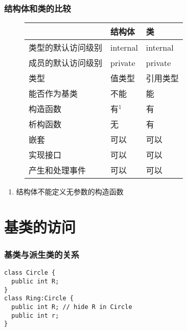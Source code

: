 \begin{frame}
\frametitle{结构体和类的比较}
\begin{figure}
  \centering
  \begin{tabular}{l|l|l}
    \hline
                       & 结构体   & 类       \\
    \hline
    类型的默认访问级别 & internal & internal \\
    成员的默认访问级别 & private  & private  \\
    类型               & 值类型   & 引用类型 \\
    能否作为基类       & 不能     & 能       \\
    构造函数           & 有$^{1}$ & 有       \\
    析构函数           & 无       & 有       \\
    嵌套               & 可以     & 可以     \\
    实现接口           & 可以     & 可以     \\
    产生和处理事件     & 可以     & 可以     \\
    \hline
  \end{tabular}
\end{figure}
\begin{enumerate}
\item 结构体不能定义无参数的构造函数
\end{enumerate}

\end{frame}

\section{基类的访问}

\begin{frame}[fragile]
\frametitle{基类与派生类的关系}
\begin{lstlisting}[escapeinside=<>]
class Circle {
  public int R;
}
class Ring:Circle {
  public int R; // hide R in Circle
  public int r;
}
\end{lstlisting}
\end{frame}

